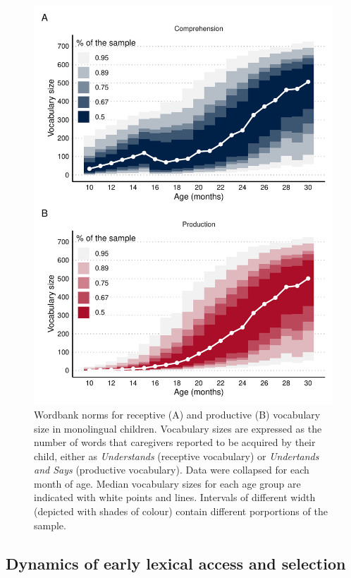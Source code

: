 \documentclass[
  12pt,
  b5paperpaper,
  twoside]{scrreprt}
\begin{document}
\begin{figure}

{\centering \includegraphics{chapters/01-introduction_files/figure-pdf/fig-wordbank-1.pdf}

}

\caption{\label{fig-wordbank}Wordbank norms for receptive (A) and
productive (B) vocabulary size in monolingual children. Vocabulary sizes
are expressed as the number of words that caregivers reported to be
acquired by their child, either as \emph{Understands} (receptive
vocabulary) or \emph{Undertands and Says} (productive vocabulary). Data
were collapsed for each month of age. Median vocabulary sizes for each
age group are indicated with white points and lines. Intervals of
different width (depicted with shades of colour) contain different
porportions of the sample.}

\end{figure}

\hypertarget{dynamics-of-early-lexical-access-and-selection}{%
\subsection{Dynamics of early lexical access and
selection}\label{dynamics-of-early-lexical-access-and-selection}}
\end{document}
